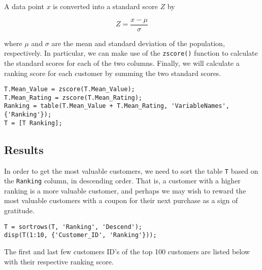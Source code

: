 \noindent
A data point $x$ is converted into a standard score $Z$ by

$$Z = \frac{x - \mu}{\sigma}$$

\noindent
where $\mu$ and $\sigma$ are the mean and standard deviation of the population, respectively. In particular, we can make use of the \lstinline|zscore()| function to calculate the standard scores for each of the two columns. Finally, we will calculate a ranking score for each customer by summing the two standard scores.

\begin{lstlisting}
T.Mean_Value = zscore(T.Mean_Value);
T.Mean_Rating = zscore(T.Mean_Rating);
Ranking = table(T.Mean_Value + T.Mean_Rating, 'VariableNames', {'Ranking'});
T = [T Ranking];
\end{lstlisting}

\subsection{Results}

In order to get the most valuable customers, we need to sort the table \lstinline|T| based on the \lstinline|Ranking| column, in descending order. That is, a customer with a higher ranking is a more valuable customer, and perhaps we may wish to reward the most valuable customers with a coupon for their next purchase as a sign of gratitude.

\begin{lstlisting}
T = sortrows(T, 'Ranking', 'Descend');
disp(T(1:10, {'Customer_ID', 'Ranking'}));
\end{lstlisting}

\noindent
The first and last few customers ID's of the top 100 customers are listed below with their respective ranking score.

